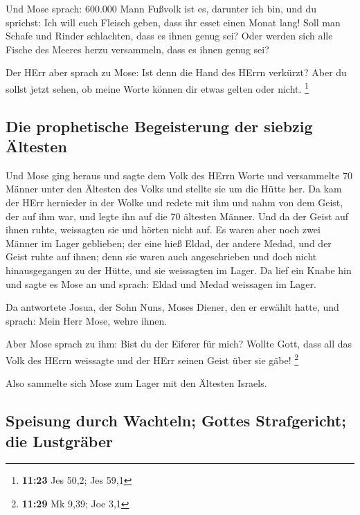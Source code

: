  Und Mose sprach: 600.000 Mann Fußvolk ist es, darunter
ich bin, und du sprichst: Ich will euch Fleisch geben, dass ihr esset
einen Monat lang!  Soll man Schafe und Rinder schlachten,
dass es ihnen genug sei? Oder werden sich alle Fische des Meeres herzu
versammeln, dass es ihnen genug sei?

 Der HErr aber sprach zu Mose: Ist denn die Hand des
HErrn verkürzt? Aber du sollst jetzt sehen, ob meine Worte können dir
etwas gelten oder nicht. \footnote{\textbf{11:23} Jes 50,2; Jes 59,1}

\hypertarget{die-prophetische-begeisterung-der-siebzig-uxe4ltesten}{%
\subsection{Die prophetische Begeisterung der siebzig
Ältesten}\label{die-prophetische-begeisterung-der-siebzig-uxe4ltesten}}

 Und Mose ging heraus und sagte dem Volk des HErrn Worte
und versammelte 70 Männer unter den Ältesten des Volks und stellte sie
um die Hütte her.  Da kam der HErr hernieder in der Wolke
und redete mit ihm und nahm von dem Geist, der auf ihm war, und legte
ihn auf die 70 ältesten Männer. Und da der Geist auf ihnen ruhte,
weissagten sie und hörten nicht auf.  Es waren aber noch
zwei Männer im Lager geblieben; der eine hieß Eldad, der andere Medad,
und der Geist ruhte auf ihnen; denn sie waren auch angeschrieben und
doch nicht hinausgegangen zu der Hütte, und sie weissagten im Lager.
 Da lief ein Knabe hin und sagte es Mose an und sprach:
Eldad und Medad weissagen im Lager.

 Da antwortete Josua, der Sohn Nuns, Moses Diener, den er
erwählt hatte, und sprach: Mein Herr Mose, wehre ihnen.

 Aber Mose sprach zu ihm: Bist du der Eiferer für mich?
Wollte Gott, dass all das Volk des HErrn weissagte und der HErr seinen
Geist über sie gäbe! \footnote{\textbf{11:29} Mk 9,39; Joe 3,1}

 Also sammelte sich Mose zum Lager mit den Ältesten
Israels.

\hypertarget{speisung-durch-wachteln-gottes-strafgericht-die-lustgruxe4ber}{%
\subsection{Speisung durch Wachteln; Gottes Strafgericht; die
Lustgräber}\label{speisung-durch-wachteln-gottes-strafgericht-die-lustgruxe4ber}}

